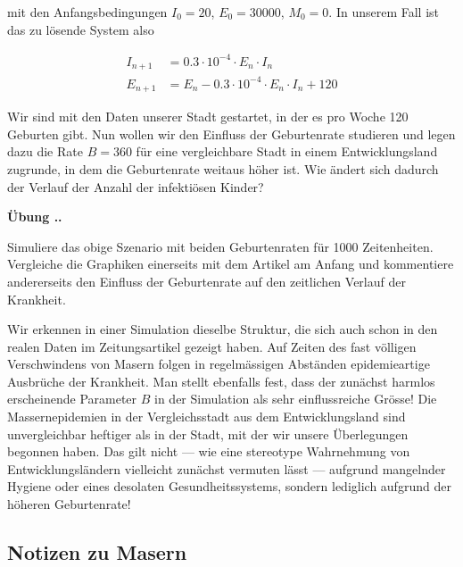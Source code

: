 \documentclass[%
11pt,%
twoside,%
titlepage,%
german,%
headsepline%
]{scrartcl}
\newcommand{\faEyeLightGray}{\textcolor{lightgray}{\faEye}} %
\newcommand{\concatueb}[1]{ueb:#1}%
\newcommand{\concatlsg}[1]{lsg:#1}%
\newcounter{uebcounter}[section]
\renewcommand{\theuebcounter}{\thesection.\arabic{uebcounter}}  %
\newenvironment{uebenv}[1]{%
    \refstepcounter{uebcounter}
    \par\noindent\textbf{Übung \theuebcounter.}%
    \label{\concatueb{#1}}\hfill\hyperref[\concatlsg{#1}]{\faEyeLightGray}\par
}{%
    \par
}
\begin{document}
mit den Anfangsbedingungen $I_0=20$, $E_0=30000$, $M_0=0$. In unserem Fall ist das zu lösende System also

\begin{align*}
I_{n+1} &= 0.3\cdot10^{-4}\cdot E_n\cdot I_n\\
E_{n+1} &= E_n-0.3\cdot10^{-4}\cdot E_n\cdot I_n+120
\end{align*}

Wir sind mit den Daten unserer Stadt gestartet, in der es pro Woche 120 Geburten gibt. Nun wollen wir den Einfluss der Geburtenrate studieren und legen dazu die Rate $B=360$ für eine vergleichbare Stadt in einem Entwicklungsland zugrunde, in dem die Geburtenrate weitaus höher ist. Wie ändert sich dadurch der Verlauf der Anzahl der infektiösen Kinder?

\begin{uebenv}{einflussgeburten}
Simuliere das obige Szenario mit beiden Geburtenraten für 1000 Zeitenheiten. Vergleiche die Graphiken einerseits mit dem Artikel am Anfang und kommentiere andererseits den Einfluss der Geburtenrate auf den zeitlichen Verlauf der Krankheit.
\end{uebenv}

Wir erkennen in einer Simulation dieselbe Struktur, die sich auch schon in den realen Daten im Zeitungsartikel gezeigt haben. Auf Zeiten des fast völligen Verschwindens von Masern folgen in regelmässigen Abständen epidemieartige Ausbrüche der Krankheit. Man stellt ebenfalls fest, dass der zunächst harmlos erscheinende Parameter $B$ in der Simulation als sehr einflussreiche Grösse! Die Massernepidemien in der Vergleichsstadt aus dem Entwicklungsland sind unvergleichbar heftiger als in der Stadt, mit der wir unsere Überlegungen begonnen haben. Das gilt nicht --- wie eine stereotype Wahrnehmung von Entwicklungsländern vielleicht zunächst vermuten lässt --- aufgrund mangelnder Hygiene oder eines desolaten Gesundheitssystems, sondern lediglich aufgrund der höheren Geburtenrate!

\clearpage

\subsection{Notizen zu Masern}
\end{document}
